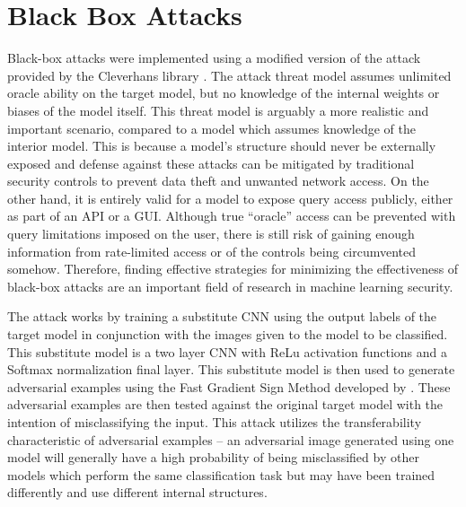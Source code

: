 \section{Black Box Attacks} \label{s:blackboxattacks}
Black-box attacks were implemented using a modified version of the attack provided by the Cleverhans library \cite{papernot2018cleverhans}.
The attack threat model assumes unlimited oracle ability on the target model, but no knowledge of the internal weights or biases of the model itself.
This threat model is arguably a more realistic and important scenario, compared to a model which assumes knowledge of the interior model.
This is because a model's structure should never be externally exposed and defense against these attacks can be mitigated by traditional security controls to prevent data theft and unwanted network access.
On the other hand, it is entirely valid for a model to expose query access publicly, either as part of an API or a GUI. Although true ``oracle'' access can be prevented with query limitations imposed on the user, there is still risk of gaining enough information from rate-limited access or of the controls being circumvented somehow.
Therefore, finding effective strategies for minimizing the effectiveness of black-box attacks are an important field of research in machine learning security.

The attack works by training a substitute CNN using the output labels of the target model in conjunction with the images given to the model to be classified.
This substitute model is a two layer CNN with ReLu activation functions and a Softmax normalization final layer.
This substitute model is then used to generate adversarial examples using the Fast Gradient Sign Method developed by \citeauthor{goodfellow2015} \cite{goodfellow2015}.
These adversarial examples are then tested against the original target model with the intention of misclassifying the input.
This attack utilizes the transferability characteristic of adversarial examples -- an adversarial image generated using one model will generally have a high probability of being misclassified by other models which perform the same classification task but may have been trained differently and use different internal structures.

